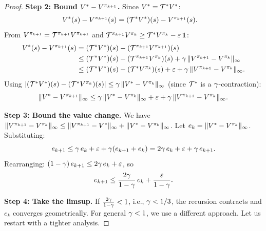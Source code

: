 \documentclass[11pt,a4paper]{article}
\begin{document}
\begin{proof}
\textbf{Step 2: Bound $V^* - V^{\pi_{k+1}}$.}
Since $V^* = \mathcal{T}^* V^*$:
\begin{align}
  V^*(s) - V^{\pi_{k+1}}(s)
  &= (\mathcal{T}^* V^*)(s) - V^{\pi_{k+1}}(s).
  \label{eq:opt_gap}
\end{align}
From $V^{\pi_{k+1}} = \mathcal{T}^{\pi_{k+1}} V^{\pi_{k+1}}$
and $\mathcal{T}^{\pi_{k+1}} V^{\pi_k} \geq \mathcal{T}^*
V^{\pi_k} - \varepsilon\,\mathbf{1}$:
\begin{align}
  V^*(s) - V^{\pi_{k+1}}(s)
  &= (\mathcal{T}^* V^*)(s)
     - (\mathcal{T}^{\pi_{k+1}} V^{\pi_{k+1}})(s) \nonumber\\
  &\leq (\mathcal{T}^* V^*)(s)
     - (\mathcal{T}^{\pi_{k+1}} V^{\pi_k})(s)
     + \gamma\,\|V^{\pi_{k+1}} - V^{\pi_k}\|_\infty
     \nonumber\\
  &\leq (\mathcal{T}^* V^*)(s)
     - (\mathcal{T}^* V^{\pi_k})(s)
     + \varepsilon
     + \gamma\,\|V^{\pi_{k+1}} - V^{\pi_k}\|_\infty.
  \label{eq:gap_bound}
\end{align}
Using $|(\mathcal{T}^* V^*)(s) - (\mathcal{T}^* V^{\pi_k})(s)|
\leq \gamma\,\|V^* - V^{\pi_k}\|_\infty$ (since $\mathcal{T}^*$
is a $\gamma$-contraction):
\begin{equation}
  \|V^* - V^{\pi_{k+1}}\|_\infty
  \leq \gamma\,\|V^* - V^{\pi_k}\|_\infty
  + \varepsilon
  + \gamma\,\|V^{\pi_{k+1}} - V^{\pi_k}\|_\infty.
  \label{eq:gap_recurse_raw}
\end{equation}

\textbf{Step 3: Bound the value change.}
We have $\|V^{\pi_{k+1}} - V^{\pi_k}\|_\infty \leq
\|V^{\pi_{k+1}} - V^*\|_\infty + \|V^* - V^{\pi_k}\|_\infty$.
Let $e_k = \|V^* - V^{\pi_k}\|_\infty$. Substituting:
\begin{equation}
  e_{k+1} \leq \gamma\, e_k + \varepsilon
  + \gamma(e_{k+1} + e_k)
  = 2\gamma\, e_k + \varepsilon + \gamma\, e_{k+1}.
\end{equation}
Rearranging: $(1 - \gamma)\, e_{k+1} \leq
2\gamma\, e_k + \varepsilon$, so
\begin{equation}
  e_{k+1} \leq \frac{2\gamma}{1-\gamma}\, e_k
  + \frac{\varepsilon}{1-\gamma}.
  \label{eq:e_recurse}
\end{equation}

\textbf{Step 4: Take the limsup.}
If $\frac{2\gamma}{1-\gamma} < 1$, i.e.,
$\gamma < 1/3$, the recursion contracts and $e_k$ converges
geometrically. For general $\gamma < 1$, we use a different
approach. Let us restart with a tighter analysis.


\end{proof}
\end{document}
